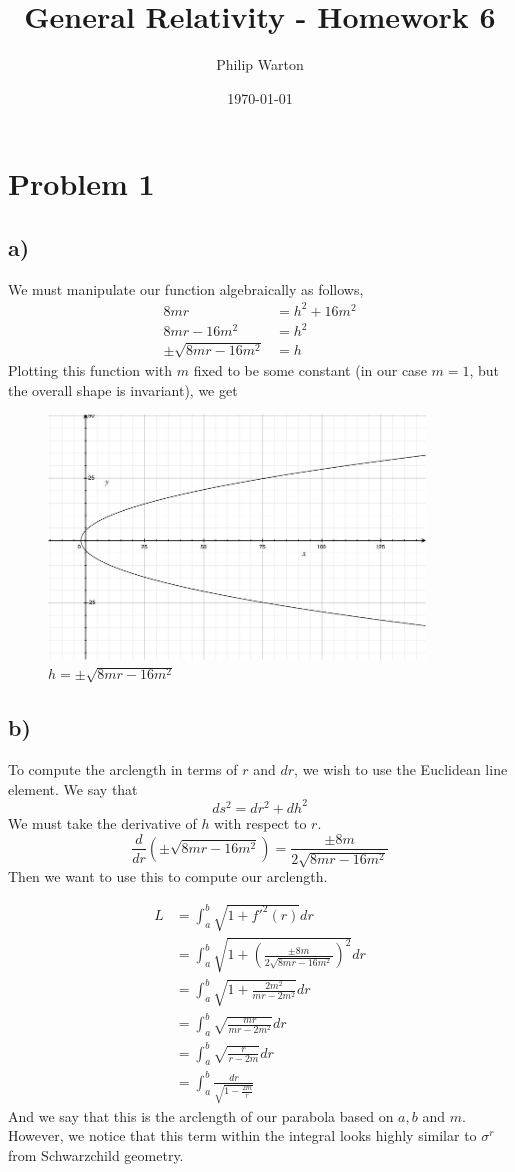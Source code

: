 \documentclass{article}
\theoremstyle{definition}
\begin{document}
\title{General Relativity - Homework 6}
\author{Philip Warton}
\date{\today}
\maketitle
\section*{Problem 1}
\subsection*{a)}
We must manipulate our function algebraically as follows,
\begin{align*}
  8mr &= h^2 + 16m^2 \\
  8mr - 16m^2 &= h^2 \\
  \pm\sqrt{8mr - 16m^2} &= h
\end{align*}
Plotting this function with $m$ fixed to be some constant (in our case $m=1$, but the overall shape
is invariant), we get
\begin{figure}[H]
    \centering
    \includegraphics[width=10cm]{figures/1.jpg}
    \caption{$h = \pm\sqrt{8mr - 16m^2}$}
  \end{figure}
\subsection*{b)}
To compute the arclength in terms of $r$ and $dr$, we wish to use the Euclidean line element.
We say that 
\[
  ds^2 = dr^2 + dh^2
\]
We must take the derivative of $h$ with respect to $r$.
\[
  \frac{d}{dr}\left(\pm\sqrt{8mr-16m^2}\right) = \frac{\pm 8m}{2\sqrt{8mr-16m^2}}
\]
Then we want to use this to compute our arclength.

\begin{align*}
  L &= \int_a^b \sqrt{1 + f'^2(r)}dr \\
  &= \int_a^b \sqrt{1 + \left(\frac{\pm8m}{2\sqrt{8mr-16m^2}}\right)^2} dr \\
  &= \int_a^b \sqrt{1 + \frac{2m^2}{mr-2m^2}} dr \\
  &= \int_a^b \sqrt{\frac{mr}{mr-2m^2}}dr \\
  &= \int_a^b \sqrt{\frac{r}{r-2m}}dr \\
  &= \int_a^b \frac{dr}{\sqrt{1- \frac{2m}{r}}}
\end{align*}
And we say that this is the arclength of our parabola based on $a,b$ and $m$. However,
we notice that this term within the integral looks highly similar to $\sigma^r$ from Schwarzchild geometry.
\end{document}
